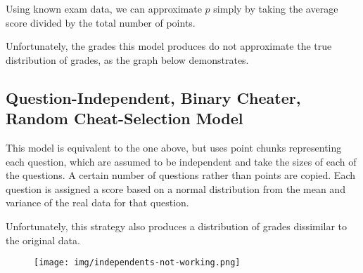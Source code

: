 \documentclass{article}
\begin{document}
            Using known exam data, we can approximate $p$ simply by taking the average score divided
                by the total number of points.

            Unfortunately, the grades this model produces do not approximate the true distribution
                of grades, as the graph below demonstrates.

        \subsection{Question-Independent, Binary Cheater, Random Cheat-Selection Model}
            This model is equivalent to the one above, but uses point chunks representing each
                question, which are assumed to be independent and take the sizes of each of the
                questions. A certain number of questions rather than points are copied. Each question
                is assigned a score based on a normal distribution from the mean and variance of
                the real data for that question.

            Unfortunately, this strategy also produces a distribution of grades dissimilar to the
                original data.

            \begin{figure}[h!]
                \centering
                \texttt{[image: img/independents-not-working.png]}
            \end{figure}
\end{document}
